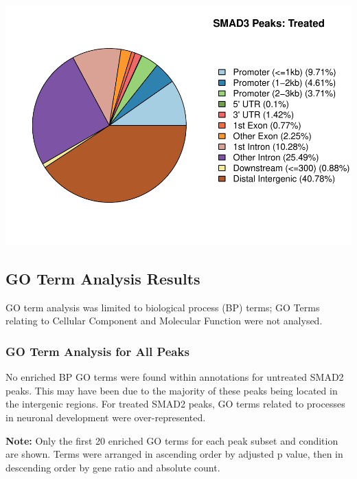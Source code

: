 \documentclass[]{article}
\begin{document}
\includegraphics{peak_annotation_go_term_analysis_files/figure-latex/unnamed-chunk-13-1.pdf}

\clearpage{}


\subsection{GO Term Analysis Results}

GO term analysis was limited to biological process (BP) terms; GO Terms
relating to Cellular Component and Molecular Function were not analysed.


\subsubsection{GO Term Analysis for All Peaks}

No enriched BP GO terms were found within annotations for untreated
SMAD2 peaks. This may have been due to the majority of these peaks being
located in the intergenic regions. For treated SMAD2 peaks, GO terms
related to processes in neuronal development were over-represented.

\textbf{Note:} Only the first 20 enriched GO terms for each peak subset
and condition are shown. Terms were arranged in ascending order by
adjusted p value, then in descending order by gene ratio and absolute
count.
\end{document}
